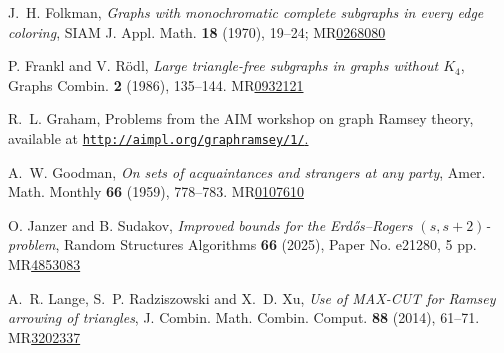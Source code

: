 \documentclass[A4paper,reqno,oneside,12pt]{amsart}
\theoremstyle{plain}
\theoremstyle{definition}
\begin{document}
\begin{thebibliography}{}


J.~H. Folkman, 
{\it Graphs with monochromatic complete subgraphs in every edge coloring},
SIAM J. Appl. Math. {\bf 18} (1970), 19--24; MR\href{https://mathscinet.ams.org/mathscinet/article?mr=268080}{0268080}

P. Frankl and V. R\"odl, 
{\it Large triangle-free subgraphs in graphs without $K_4$},
Graphs Combin. {\bf 2} (1986), 135--144.
MR\href{https://mathscinet.ams.org/mathscinet/article?mr=932121}{0932121}


R.~L. Graham, Problems from the AIM workshop on graph Ramsey theory, 
available at \href{http://aimpl.org/graphramsey/1/}{{\tt http://aimpl.org/graphramsey/1/}.}

A.~W. Goodman, 
{\it On sets of acquaintances and strangers at any party},
Amer. Math. Monthly {\bf 66} (1959), 778--783.
MR\href{https://mathscinet.ams.org/mathscinet/article?mr=107610}{0107610}


O. Janzer and B. Sudakov, 
{\it Improved bounds for the Erd\H{o}s--Rogers $(s,s+2)$-problem},
Random Structures Algorithms {\bf 66} (2025), Paper No. e21280, 5 pp.
MR\href{https://mathscinet.ams.org/mathscinet/article?mr=4853083}{4853083}

A.~R. Lange, S.~P. Radziszowski and X.~D. Xu, 
{\it Use of MAX-CUT for Ramsey arrowing of triangles},
J. Combin. Math. Combin. Comput. {\bf 88} (2014), 61--71.
MR\href{https://mathscinet.ams.org/mathscinet/article?mr=3202337}{3202337}


\end{thebibliography}
\end{document}
